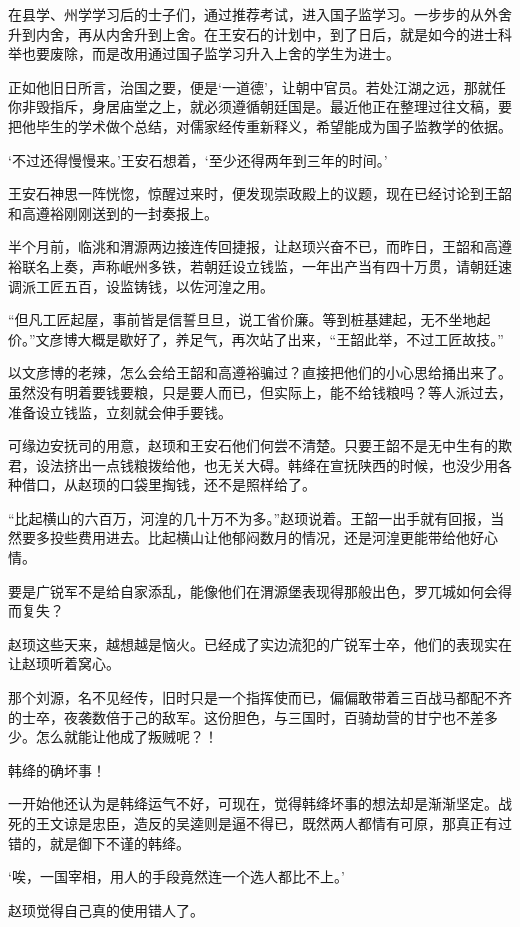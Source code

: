 在县学、州学学习后的士子们，通过推荐考试，进入国子监学习。一步步的从外舍升到内舍，再从内舍升到上舍。在王安石的计划中，到了日后，就是如今的进士科举也要废除，而是改用通过国子监学习升入上舍的学生为进士。

正如他旧日所言，治国之要，便是‘一道德’，让朝中官员。若处江湖之远，那就任你非毁指斥，身居庙堂之上，就必须遵循朝廷国是。最近他正在整理过往文稿，要把他毕生的学术做个总结，对儒家经传重新释义，希望能成为国子监教学的依据。

‘不过还得慢慢来。’王安石想着，‘至少还得两年到三年的时间。’

王安石神思一阵恍惚，惊醒过来时，便发现崇政殿上的议题，现在已经讨论到王韶和高遵裕刚刚送到的一封奏报上。

半个月前，临洮和渭源两边接连传回捷报，让赵顼兴奋不已，而昨日，王韶和高遵裕联名上奏，声称岷州多铁，若朝廷设立钱监，一年出产当有四十万贯，请朝廷速调派工匠五百，设监铸钱，以佐河湟之用。

“但凡工匠起屋，事前皆是信誓旦旦，说工省价廉。等到桩基建起，无不坐地起价。”文彦博大概是歇好了，养足气，再次站了出来，“王韶此举，不过工匠故技。”

以文彦博的老辣，怎么会给王韶和高遵裕骗过？直接把他们的小心思给捅出来了。虽然没有明着要钱要粮，只是要人而已，但实际上，能不给钱粮吗？等人派过去，准备设立钱监，立刻就会伸手要钱。

可缘边安抚司的用意，赵顼和王安石他们何尝不清楚。只要王韶不是无中生有的欺君，设法挤出一点钱粮拨给他，也无关大碍。韩绛在宣抚陕西的时候，也没少用各种借口，从赵顼的口袋里掏钱，还不是照样给了。

“比起横山的六百万，河湟的几十万不为多。”赵顼说着。王韶一出手就有回报，当然要多投些费用进去。比起横山让他郁闷数月的情况，还是河湟更能带给他好心情。

要是广锐军不是给自家添乱，能像他们在渭源堡表现得那般出色，罗兀城如何会得而复失？

赵顼这些天来，越想越是恼火。已经成了实边流犯的广锐军士卒，他们的表现实在让赵顼听着窝心。

那个刘源，名不见经传，旧时只是一个指挥使而已，偏偏敢带着三百战马都配不齐的士卒，夜袭数倍于己的敌军。这份胆色，与三国时，百骑劫营的甘宁也不差多少。怎么就能让他成了叛贼呢？！

韩绛的确坏事！

一开始他还认为是韩绛运气不好，可现在，觉得韩绛坏事的想法却是渐渐坚定。战死的王文谅是忠臣，造反的吴逵则是逼不得已，既然两人都情有可原，那真正有过错的，就是御下不谨的韩绛。

‘唉，一国宰相，用人的手段竟然连一个选人都比不上。’

赵顼觉得自己真的使用错人了。

